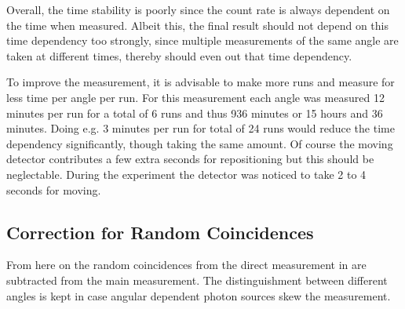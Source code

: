 \documentclass[sn-mathphys-num,icol]{sn-jnl}
\theoremstyle{thmstyleone}
\theoremstyle{thmstyletwo}
\theoremstyle{thmstylethree}
\begin{document}
Overall, the time stability is poorly since the count rate is always dependent on the time when measured. Albeit this, the final result should not depend on this time dependency too strongly, since multiple measurements of the same angle are taken at different times, thereby should even out that time dependency.

To improve the measurement, it is advisable to make more runs and measure for less time per angle per run. For this measurement each angle was measured 12 minutes per run for a total of 6 runs and thus 936 minutes or 15 hours and 36 minutes. Doing e.g. 3 minutes per run for total of 24 runs would reduce the time dependency significantly, though taking the same amount. Of course the moving detector contributes a few extra seconds for repositioning but this should be neglectable. During the experiment the detector was noticed to take 2 to 4 seconds for moving.
\subsection{Correction for Random Coincidences}
From here on the random coincidences from the direct measurement in  are subtracted from the main measurement. The distinguishment between different angles is kept in case angular dependent photon sources skew the measurement.
\end{document}

